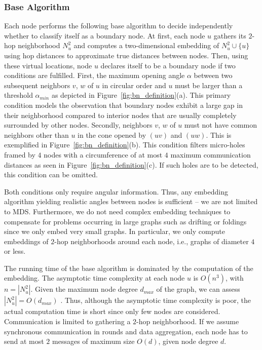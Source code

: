 \documentclass{llncs}
\begin{document}
\subsubsection{Base Algorithm}
Each node performs the following base algorithm to decide independently whether to classify itself as a boundary node.
At first, each node $u$ gathers its $2$-hop neighborhood $N_u^2$ and computes a two-dimensional embedding of $N_u^2 \cup \{u\}$ using hop distances to approximate true distances between nodes.
Then, using these virtual locations, node $u$ declares itself to be a boundary node if two conditions are fulfilled.
First, the maximum opening angle $\alpha$ between two subsequent neighbors $v$, $w$ of $u$ in circular order and $u$ must be larger than a threshold $\alpha_{min}$ as depicted in Figure~\ref{fig:bn_definition}(a).
This primary condition models the observation that boundary nodes exhibit a large gap in their neighborhood compared to interior nodes that are usually completely surrounded by other nodes.
Secondly, neighbors $v$, $w$ of $u$ must not have common neighbors other than $u$ in the cone opened by $(uv)$ and $(uw)$.
This is exemplified in Figure~\ref{fig:bn_definition}(b).
This condition filters micro-holes framed by $4$ nodes with a circumference of at most $4$ maximum communication distances as seen in Figure~\ref{fig:bn_definition}(c).
If such holes are to be detected, this condition can be omitted.

Both conditions only require angular information.
Thus, any embedding algorithm yielding realistic angles between nodes is sufficient -- we are not limited to MDS.
Furthermore, we do not need complex embedding techniques to compensate for problems occurring in large graphs such as drifting or foldings since we only embed very small graphs.
In particular, we only compute embeddings of $2$-hop neighborhoods around each node, i.e., graphs of diameter $4$ or less.

The running time of the base algorithm is dominated by the computation of the embedding.
The asymptotic time complexity at each node $u$ is $O(n^3)$, with $n=|N_u^2|$.
Given the maximum node degree $d_{max}$ of the graph, we can assess $|N_u^2|=O(d_{max})$ \cite{pg-fdwcd-04}.
Thus, although the asymptotic time complexity is poor, the actual computation time is short since only few nodes are considered.
Communication is limited to gathering a $2$-hop neighborhood.
If we assume synchronous communication in rounds and data aggregation, each node has to send at most $2$ messages of maximum size $O(d)$, given node degree $d$.
\end{document}
